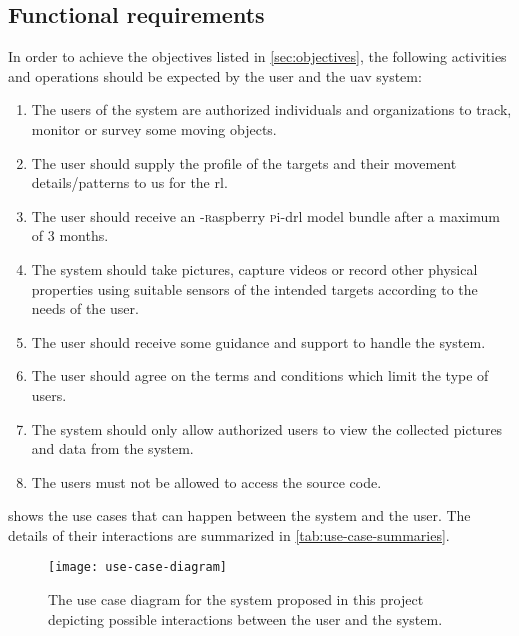 \documentclass[../main.tex]{subfiles}
\begin{document}
\subsection{Functional requirements}

In order to achieve the objectives listed
in \cref{sec:objectives}, the following activities 
and operations should be expected by the user 
and the \gls{uav} system:

\begin{enumerate}
    \item The users of the system are authorized
        individuals and organizations to track, monitor or survey
        some moving objects.
    \item The user should supply the 
        profile of the targets 
        and their movement details/patterns
        to us for the \gls{rl}.
    \item The user should receive 
        an \anafi-\textsc{r}aspberry \textsc{p}i-\gls{drl} 
        model bundle after a maximum of 3 months.
    \item The system should take pictures, capture videos
        or record other physical properties using
        suitable sensors of the intended
        targets according to the needs
        of the user.
    \item The user should receive some 
        guidance and support 
        to handle the system.
    \item The user should agree on 
        the terms and conditions 
        which limit the type of users.
    \item The system should only allow 
        authorized users 
        to view the collected pictures and 
        data from the \anafi system.
    \item The users must not be allowed to access 
        the source code.
\end{enumerate}

 shows the use cases that can
happen between the system and the user. The details of their
interactions are summarized in \cref{tab:use-case-summaries}.

\begin{figure}[b!] 
    \centering
    \texttt{[image: use-case-diagram]} 
    \caption{The use case diagram for the system proposed 
            in this project depicting possible interactions 
            between the user and the system.}
    \label{fig:use-case-diagram} 
\end{figure}
\end{document}
